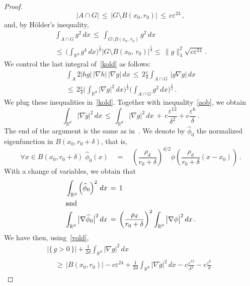 \documentclass[10pt]{amsart}
\theoremstyle{definition}\newtheorem{defi}[theo]{Definition}\newtheorem{rema}[theo]{Remark}\newtheorem{exam}[theo]{Example}\newtheorem{exem}[theo]{Example}\newtheorem{nota}[theo]{Notation}
\newcommand*\Rd {{\mathbb R^d}}
\newcommand*\hp{{\widehat \phi}}
\newcommand*\gt{\widetilde g}
\let\oldforall\forall
\renewcommand*{\forall}{\mathrel{\oldforall}}
\begin{document}
\begin{proof}
\begin{equation}\label{vold}
\big|A\cap G\big|
\,\leq\,
\big|G\setminus B(x_0,r_0)\big|
\,\leq\, c\varepsilon^{24}
\,,
\end{equation}
and, by H\"older's inequality,
\begin{multline}\label{hold}
\int_{A\cap G}g^2\,dx\,\leq\,
\int_{G\setminus B(x_0,\,r_0)}g^2\,dx\,
\\
\leq\,\Big(
\int_{\Rd}g^4\,dx
\Big)^{\frac{1}{2}}
\big|G\setminus B(x_0,\,r_0)\big| ^{\frac{1}{2}}
\leq\, \|g\|_4^2
\sqrt{c\varepsilon^{24}}\,.
\end{multline}
We control the last integral of~\eqref{kold} as follows:
\begin{multline}\label{last}
\int_{A}2 |hg| \,
\big|\nabla h\big|\,
\big|\nabla g\big|\,dx
\,\leq\, 2\frac{c}{\delta}
\int_{A\cap G} \,
\big|g\nabla g\big|\,dx
\\
\leq\, 2\frac{c}{\delta}
\Big(\int_{\Rd}\big|\nabla g\big|^2\,dx\Big)^{\frac{1}{2}}
\Big(\int_{A\cap G}g^2\,dx\Big)^{\frac{1}{2}}
\,.
\end{multline}
We plug these inequalities in~\eqref{kold}. Together with inequality~\eqref{aob}, we obtain
\begin{equation}
\int_{\Rd}\big|\nabla \gt\big|^2\,dx\,\leq\,
\int_{\Rd}\big|\nabla g\big|^2\,dx\,+\, c
\frac{\varepsilon^{12}}{\delta^2}+ c
\frac{\varepsilon^{6}}{\delta}\,.
\end{equation}
The end of the argument is the same as in~\cite[Lemma~$A.1$]{BO}. We denote by $\hp_0$ the normalized eigenfunction in $B(x_0,r_0+\delta)$, that is,
\[
\forall x\in
B(x_0,r_0+\delta)\;
\hp_0(x)\quad=\quad
\left(\frac{\rho_d}{r_0+\delta}\right)^{d/2}
\phi\left(
\frac{\rho_d}{r_0+\delta}(x-x_0)\right)\,.
\]
With a change of variables, we obtain that
\begin{align*}
\int_{\Rd}\left(\hp_0\right)^2\,dx\,&=\,1\\
\intertext{and}
\int_{\Rd}\big|\nabla \hp_0\big|^2\,dx\,&=\,
\left(\frac{\rho_d}{r_0+\delta}\right)^{2}
\int_{\Rd}\big|\nabla \phi\big|^2\,dx\,.
\end{align*}
We have then, using~\eqref{vold},
\begin{multline}\label{glob}
\big|\{\,g>0\,\}\big| +
\frac{1}{2d}
\int_{\Rd}\big|\nabla g\big|^2\,dx\\
\begin{aligned}
&\geq\,\big|B(x_0,r_0)\big|- c\varepsilon^{24} +\frac{1}{2d}
\int_{\Rd}\big|\nabla \gt\big|^2\,dx -c
\frac{\varepsilon^{12}}{\delta^2}- c
\frac{\varepsilon^{6}}{\delta}

\end{aligned}
\end{multline}
\end{proof}
\end{document}
